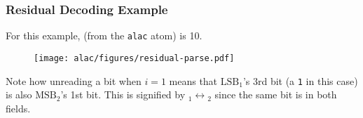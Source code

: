 \begin{landscape}
\subsubsection{Residual Decoding Example}
For this example,  (from the \texttt{alac} atom) is 10.
\par
\begin{figure}[h]
\texttt{[image: alac/figures/residual-parse.pdf]}
\end{figure}
\par
\noindent
Note how unreading a bit when $i = 1$ means that $\text{LSB}_1$'s 3rd bit
(a \texttt{1} in this case) is also $\text{MSB}_2$'s 1st bit.
This is signified by $\text{}_1 \leftrightarrow \text{}_2$
since the same bit is in both fields.

\clearpage


\end{landscape}
